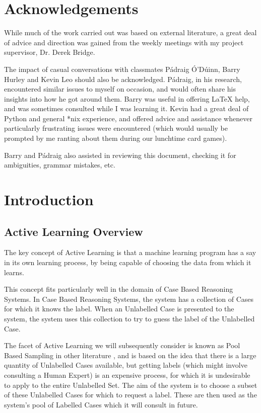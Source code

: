 \documentclass[a4paper,11pt]{report}
\begin{document}
\chapter*{Acknowledgements}
While much of the work carried out was based on external literature, a great deal of advice and direction was gained from the weekly meetings with my project supervisor, Dr. Derek Bridge.

The impact of casual conversations with classmates P\'{a}draig \'{O}'D\'uinn, Barry Hurley and Kevin Leo should also be acknowledged. P\'{a}draig, in his research, encountered similar issues to myself on occasion, and would often share his insights into how he got around them. Barry was useful in offering \LaTeX{} help, and was sometimes consulted while I was learning it. Kevin had a great deal of Python and general *nix experience, and offered advice and assistance whenever particularly frustrating issues were encountered (which would usually be prompted by me ranting about them during our lunchtime card games).

Barry and P\'{a}draig also assisted in reviewing this document, checking it for ambiguities, grammar mistakes, etc.

\tableofcontents

\chapter{Introduction}
\section{Active Learning Overview}
The key concept of Active Learning is that a machine learning program has a say in its own learning process, by being capable of choosing the data from which it learns. 

This concept fits particularly well in the domain of Case Based Reasoning Systems. In Case Based Reasoning Systems, the system has a collection of Cases for which it knows the label. When an Unlabelled Case is presented to the system, the system uses this collection to try to guess the label of the Unlabelled Case.

The facet of Active Learning we will subsequently consider is known as Pool Based Sampling in other literature \citep{Settles2010}, and is based on the idea that there is a large quantity of Unlabelled Cases available, but getting labels (which might involve consulting a Human Expert) is an expensive process, for which it is undesirable to apply to the entire Unlabelled Set. The aim of the system is to choose a subset of these Unlabelled Cases for which to request a label. These are then used as the system's pool of Labelled Cases which it will consult in future.
\end{document}
